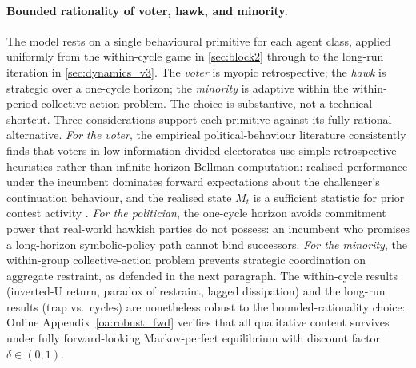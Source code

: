 \documentclass[11pt,twoside]{extarticle}
\begin{document}
\paragraph{Bounded rationality of voter, hawk, and minority.} The model rests on a single behavioural primitive for each agent class, applied uniformly from the within-cycle game in \autoref{sec:block2} through to the long-run iteration in \autoref{sec:dynamics_v3}. The \emph{voter} is myopic retrospective; the \emph{hawk} is strategic over a one-cycle horizon; the \emph{minority} is adaptive within the within-period collective-action problem. The choice is substantive, not a technical shortcut. Three considerations support each primitive against its fully-rational alternative. \emph{For the voter}, the empirical political-behaviour literature consistently finds that voters in low-information divided electorates use simple retrospective heuristics rather than infinite-horizon Bellman computation: realised performance under the incumbent dominates forward expectations about the challenger's continuation behaviour, and the realised state $M_t$ is a sufficient statistic for prior contest activity \citep*{healyMyopicVotersNatural2009,achenDemocracyRealistsWhy2017}. \emph{For the politician}, the one-cycle horizon avoids commitment power that real-world hawkish parties do not possess: an incumbent who promises a long-horizon symbolic-policy path cannot bind successors. \emph{For the minority}, the within-group collective-action problem prevents strategic coordination on aggregate restraint, as defended in the next paragraph. The within-cycle results (inverted-U return, paradox of restraint, lagged dissipation) and the long-run results (trap vs.\ cycles) are nonetheless robust to the bounded-rationality choice: Online Appendix~\ref{oa:robust_fwd} verifies that all qualitative content survives under fully forward-looking Markov-perfect equilibrium with discount factor $\delta\in(0,1)$.
\end{document}
